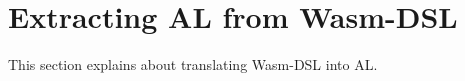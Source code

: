 \section{Extracting AL from Wasm-DSL}\label{sec:translate}

This section explains about translating Wasm-DSL into AL.
